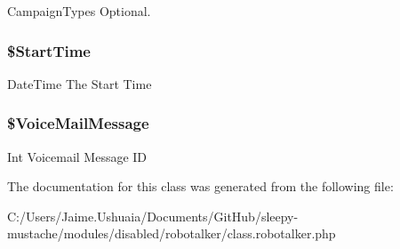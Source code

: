 Campaign\-Types Optional. \hypertarget{class_schedule_calls_request_of_int32_a2f8fa05008bd8e80ae9cb79699e0ed2c}{
\subsubsection[{\$\-Start\-Time}]{\setlength{\rightskip}{0pt plus 5cm}\$Start\-Time}}\label{class_schedule_calls_request_of_int32_a2f8fa05008bd8e80ae9cb79699e0ed2c}
Date\-Time The Start Time \hypertarget{class_schedule_calls_request_of_int32_ab8946a1492b48b7d64a4e6f298903f74}{
\subsubsection[{\$\-Voice\-Mail\-Message}]{\setlength{\rightskip}{0pt plus 5cm}\$Voice\-Mail\-Message}}\label{class_schedule_calls_request_of_int32_ab8946a1492b48b7d64a4e6f298903f74}
Int Voicemail Message I\-D 

The documentation for this class was generated from the following file\-:\begin{DoxyCompactItemize}
\item 
C\-:/\-Users/\-Jaime.\-Ushuaia/\-Documents/\-Git\-Hub/sleepy-\/mustache/modules/disabled/robotalker/class.\-robotalker.\-php\end{DoxyCompactItemize}

